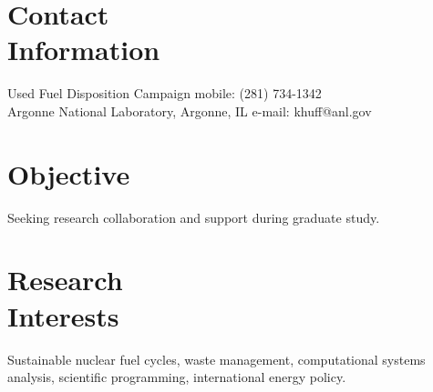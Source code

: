\documentclass[margin,line]{resume}
\begin{document}
\begin{resume}

    \section{\mysidestyle Contact\\Information}

    Used Fuel Disposition Campaign                          \hfill mobile: (281) 734-1342           \vspace{0mm}\\\vspace{0mm}%
    Argonne National Laboratory, Argonne, IL                \hfill e-mail: khuff@anl.gov            \vspace{0mm}\\\vspace{-4.5mm}%

    \section{\mysidestyle Objective}
		Seeking research collaboration and support during graduate study.%
    \section{\mysidestyle Research\\Interests}
		Sustainable nuclear fuel cycles, waste management, computational systems analysis, scientific programming, international energy policy.%

\end{resume}
\end{document}
